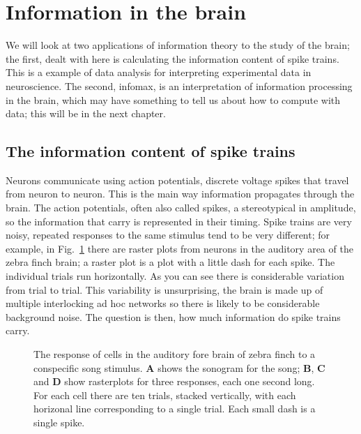 \documentclass[12pt]{article}
\begin{document}
\section*{Information in the brain} 

We will look at two applications of information theory to the study of
the brain; the first, dealt with here is calculating the information
content of spike trains. This is a example of data analysis for
interpreting experimental data in neuroscience. The second, infomax,
is an interpretation of information processing in the brain, which may
have something to tell us about how to compute with data; this will be
in the next chapter.

\subsection*{The information content of spike trains}

Neurons communicate using action potentials, discrete voltage spikes
that travel from neuron to neuron. This is the main way information
propagates through the brain. The action potentials, often also called
spikes, a stereotypical in amplitude, so the information that carry is
represented in their timing. Spike trains are very noisy, repeated
responses to the same stimulus tend to be very different; for example,
in Fig.~\ref{fig_zebra_finch} there are raster plots from neurons in
the auditory area of the zebra finch brain; a raster plot is a plot
with a little dash for each spike. The individual trials run
horizontally. As you can see there is considerable variation from
trial to trial. This variability is unsurprising, the brain is made up
of multiple interlocking ad hoc networks so there is likely to be
considerable background noise. The question is then, how much
information do spike trains carry.

\begin{figure}[htb]
\begin{center}

\end{center}
\caption{The response of cells in the auditory fore brain of zebra
  finch to a conspecific song stimulus. \textbf{A} shows the sonogram
  for the song; \textbf{B}, \textbf{C} and \textbf{D} show rasterplots
  for three responses, each one second long. For each cell there are
  ten trials, stacked vertically, with each horizonal line
  corresponding to a single trial. Each small dash is a single
  spike.\label{fig_zebra_finch}}
\end{figure}
\end{document}
